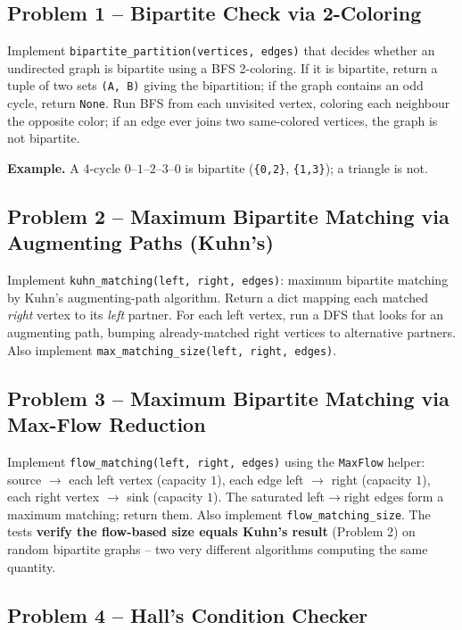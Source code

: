 \documentclass[11pt]{article}
\begin{document}
\subsection*{Problem 1 -- Bipartite Check via 2-Coloring}

Implement \texttt{bipartite\_partition(vertices, edges)} that decides whether an
undirected graph is bipartite using a BFS 2-coloring. If it is bipartite, return a tuple
of two sets \texttt{(A, B)} giving the bipartition; if the graph contains an odd cycle,
return \texttt{None}. Run BFS from each unvisited vertex, coloring each neighbour the
opposite color; if an edge ever joins two same-colored vertices, the graph is not
bipartite.

\textbf{Example.} A 4-cycle $0$--$1$--$2$--$3$--$0$ is bipartite (\texttt{\{0,2\}},
\texttt{\{1,3\}}); a triangle is not.

\subsection*{Problem 2 -- Maximum Bipartite Matching via Augmenting Paths (Kuhn's)}

Implement \texttt{kuhn\_matching(left, right, edges)}: maximum bipartite matching by
Kuhn's augmenting-path algorithm. Return a dict mapping each matched \emph{right} vertex
to its \emph{left} partner. For each left vertex, run a DFS that looks for an augmenting
path, bumping already-matched right vertices to alternative partners. Also implement
\texttt{max\_matching\_size(left, right, edges)}.

\subsection*{Problem 3 -- Maximum Bipartite Matching via Max-Flow Reduction}

Implement \texttt{flow\_matching(left, right, edges)} using the \texttt{MaxFlow} helper:
source $\to$ each left vertex (capacity $1$), each edge left $\to$ right (capacity $1$),
each right vertex $\to$ sink (capacity $1$). The saturated left$\to$right edges form a
maximum matching; return them. Also implement \texttt{flow\_matching\_size}. The tests
\textbf{verify the flow-based size equals Kuhn's result} (Problem 2) on random bipartite
graphs -- two very different algorithms computing the same quantity.

\subsection*{Problem 4 -- Hall's Condition Checker}
\end{document}
